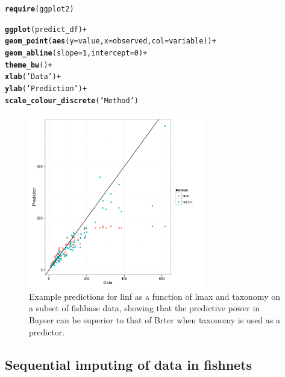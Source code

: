 \documentclass{dragonfly-report}\usepackage[]{graphicx}\usepackage[]{color}
\makeatletter
\newcommand{\hlnum}[1]{\textcolor[rgb]{0.686,0.059,0.569}{#1}}%
\newcommand{\hlstr}[1]{\textcolor[rgb]{0.192,0.494,0.8}{#1}}%
\newcommand{\hlopt}[1]{\textcolor[rgb]{0,0,0}{#1}}%
\newcommand{\hlstd}[1]{\textcolor[rgb]{0.345,0.345,0.345}{#1}}%
\newcommand{\hlkwc}[1]{\textcolor[rgb]{0.333,0.667,0.333}{#1}}%
\newcommand{\hlkwd}[1]{\textcolor[rgb]{0.737,0.353,0.396}{\textbf{#1}}}%
\newenvironment{kframe}{%
 \def\at@end@of@kframe{}%
 \ifinner\ifhmode%
  \def\at@end@of@kframe{\end{minipage}}%
  \begin{minipage}{\columnwidth}%
 \fi\fi%
 \def\FrameCommand##1{\hskip\@totalleftmargin \hskip-\fboxsep
 \colorbox{shadecolor}{##1}\hskip-\fboxsep
     \hskip-\linewidth \hskip-\@totalleftmargin \hskip\columnwidth}%
 \MakeFramed {\advance\hsize-\width
   \@totalleftmargin\z@ \linewidth\hsize
   \@setminipage}}%
 {\par\unskip\endMakeFramed%
 \at@end@of@kframe}
\newenvironment{knitrout}{}{} %
\makeatother
\begin{document}
\begin{knitrout}
\color{fgcolor}\begin{kframe}
\begin{alltt}
\hlkwd{require}\hlstd{(ggplot2)}

\hlkwd{ggplot}\hlstd{(predict_df)} \hlopt{+}
  \hlkwd{geom_point}\hlstd{(}\hlkwd{aes}\hlstd{(}\hlkwc{y} \hlstd{= value,} \hlkwc{x} \hlstd{= observed,} \hlkwc{col} \hlstd{= variable))} \hlopt{+}
  \hlkwd{geom_abline}\hlstd{(}\hlkwc{slope}\hlstd{=}\hlnum{1}\hlstd{,} \hlkwc{intercept}\hlstd{=}\hlnum{0}\hlstd{)} \hlopt{+}
  \hlkwd{theme_bw}\hlstd{()} \hlopt{+}
  \hlkwd{xlab}\hlstd{(}\hlstr{'Data'}\hlstd{)} \hlopt{+}
  \hlkwd{ylab}\hlstd{(}\hlstr{'Prediction'}\hlstd{)} \hlopt{+}
  \hlkwd{scale_colour_discrete}\hlstd{(}\hlstr{'Method'}\hlstd{)}
\end{alltt}
\end{kframe}\begin{figure}[]


{\centering \includegraphics[width=3in,height=3 in]{figure/unnamed-chunk-2-1} 

}

\caption[Example predictions for linf as a function of lmax and taxonomy on a subset of fishbase data, showing that the predictive power in Bayser can be superior to that of Brter when taxonomy is used as a predictor]{Example predictions for linf as a function of lmax and taxonomy on a subset of fishbase data, showing that the predictive power in Bayser can be superior to that of Brter when taxonomy is used as a predictor.\label{fig:unnamed-chunk-2}}
\end{figure}


\end{knitrout}


\subsection{Sequential imputing of data in fishnets}
\end{document}
